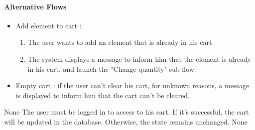 {  \paragraph{Alternative Flows}
  \begin{itemize}
    \item Add element to cart :
    \begin{enumerate}
      \item The user wants to add an element that is already in his cart
      \item The system displays a message to inform him that the element is already in his cart, and launch the "Change quantity" sub flow.
    \end{enumerate}
    \item Empty cart : if the user can't clear his cart, for unknown reasons, a message is displayed to inform him that the cart can't be cleared.
  \end{itemize}
}
{None}
{The user must be logged in to access to his cart.}
{If it’s successful, the cart will be updated in the database. Otherwise, the state remains unchanged.}
{None}

